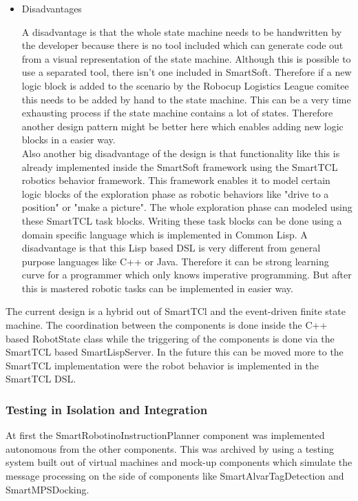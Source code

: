 \begin{itemize}
\item Disadvantages

A disadvantage is that the whole state machine needs to be handwritten by the developer because there is no tool included which can generate code out from a visual representation 
of the state machine. Although this is possible to use a separated tool, there isn't one included in SmartSoft. Therefore if a new logic block is added to the scenario by the Robocup Logistics League comitee this needs to be added by hand to the state machine. This can be a very time exhausting process if the state machine contains a lot of states. Therefore another design pattern might be better here which enables adding new logic blocks in a easier way. \\

Also another big disadvantage of the design is that functionality like this is already implemented inside the SmartSoft framework using the SmartTCL robotics behavior framework.
This framework enables it to model certain logic blocks of the exploration phase as robotic behaviors like "drive to a position" or "make a picture". The whole exploration phase can modeled using these SmartTCL task blocks. Writing these task blocks can be done using a domain specific language which is implemented in Common Lisp. A disadvantage is that this Lisp based DSL is very different from general purpose languages like C++ or Java. Therefore it can be strong learning curve for a programmer which only knows imperative programming. But after this is mastered robotic tasks can be implemented in easier way. 


\end{itemize}


The current design is a hybrid out of SmartTCl and the event-driven finite state machine. The coordination between the components is done inside the C++ based RobotState class while the
triggering of the components is done via the SmartTCL based SmartLispServer. In the future this can be moved more to the SmartTCL implementation were the robot behavior is implemented in the SmartTCL DSL. 


\subsubsection{Testing in Isolation and Integration}

At first the SmartRobotinoInstructionPlanner component was implemented autonomous from the other components. This was archived by using a testing system built out of virtual machines and mock-up components which simulate the message processing on the side of components like SmartAlvarTagDetection and SmartMPSDocking. \\

